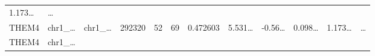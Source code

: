\documentclass[
]{article}
\begin{document}
\begin{longtable}[]{@{}llllllllllll@{}}
\begin{minipage}[t]{0.09\columnwidth}
1.173\ldots{}\strut
\end{minipage} & \begin{minipage}[t]{0.02\columnwidth}\raggedright
\ldots{}\strut
\end{minipage}\tabularnewline
\begin{minipage}[t]{0.06\columnwidth}\raggedright
THEM4\strut
\end{minipage} & \begin{minipage}[t]{0.06\columnwidth}\raggedright
chr1\_\ldots{}\strut
\end{minipage} & \begin{minipage}[t]{0.06\columnwidth}\raggedright
chr1\_\ldots{}\strut
\end{minipage} & \begin{minipage}[t]{0.06\columnwidth}\raggedright
292320\strut
\end{minipage} & \begin{minipage}[t]{0.06\columnwidth}\raggedright
52\strut
\end{minipage} & \begin{minipage}[t]{0.06\columnwidth}\raggedright
69\strut
\end{minipage} & \begin{minipage}[t]{0.06\columnwidth}\raggedright
0.472603\strut
\end{minipage} & \begin{minipage}[t]{0.08\columnwidth}\raggedright
5.531\ldots{}\strut
\end{minipage} & \begin{minipage}[t]{0.06\columnwidth}\raggedright
-0.56\ldots{}\strut
\end{minipage} & \begin{minipage}[t]{0.06\columnwidth}\raggedright
0.098\ldots{}\strut
\end{minipage} & \begin{minipage}[t]{0.09\columnwidth}\raggedright
1.173\ldots{}\strut
\end{minipage} & \begin{minipage}[t]{0.02\columnwidth}\raggedright
\ldots{}\strut
\end{minipage}\tabularnewline
\begin{minipage}[t]{0.06\columnwidth}\raggedright
THEM4\strut
\end{minipage} & \begin{minipage}[t]{0.06\columnwidth}\raggedright
chr1\_\ldots{}\strut
\end{minipage} & \begin{minipage}[t]{0.06\columnwidth}\raggedright

\end{minipage}
\end{longtable}
\end{document}

